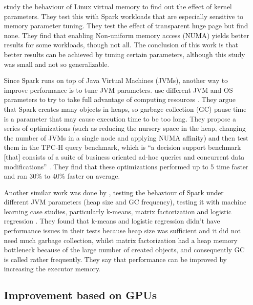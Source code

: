 \documentclass{article}
\begin{document}
\citeauthor{Wang2016} \cite{Wang2016} study the behaviour of Linux virtual memory to find out the effect of kernel parameters. They test this with Spark workloads that are especially sensitive to memory parameter tuning. They test the effect of transparent huge page but find none. They find that enabling Non-uniform memory access (NUMA) yields better results for some workloads, though not all. The conclusion of this work is that better results can be achieved by tuning certain parameters, although this study was small and not so generalizable.

Since Spark runs on top of Java Virtual Machines (JVMs), another way to improve performance is to tune JVM parameters. \citeauthor{Chiba2016} use different JVM and OS parameters to try to take full advantage of computing resources \cite{Chiba2016}. They argue that Spark creates many objects in heaps, so garbage collection (GC) pause time is a parameter that may cause execution time to be too long. They propose a series of optimizations (such as reducing the nursery space in the heap, changing the number of JVMs in a single node and applying NUMA affinity) and then test them in the TPC-H query benchmark,  which is ``a decision support benchmark [that] consists of a suite of business oriented ad-hoc queries and concurrent data modifications'' \cite{TPC_H_benchmark}. They find that these optimizations performed up to 5 time faster and ran 30\% to 40\% faster on average.

Another similar work was done by \citeauthor{Hema2016}, testing the behaviour of Spark under different JVM parameters (heap size and GC frequency), testing it with machine learning case studies, particularly k-means, matrix factorization and logistic regression \cite{Hema2016}. They found that k-means and logistic regression didn't have performance issues in their tests because heap size was sufficient and it did not need much garbage collection, whilst matrix factorization had a heap memory bottleneck because of the large number of created objects, and consequently GC is called rather frequently. They say that performance can be improved by increasing the executor memory.

\subsection{Improvement based on GPUs}
\end{document}
